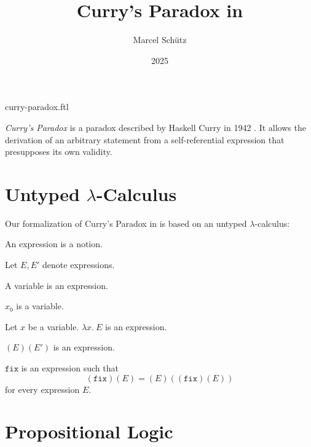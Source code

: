 \documentclass{stex}
\title{Curry's Paradox in \Naproche}
\author{Marcel Schütz}
\date{2025}
\newcommand{\varzero}{x_0}
\newcommand{\abs}[2]{\lambda#1.\ #2}
\newcommand{\app}[2]{(#1)(#2)}
\newcommand{\fix}{\texttt{fix}}
\begin{document}
\begin{smodule}{curry-paradox.ftl}
\maketitle

\noindent \emph{Curry's Paradox} is a paradox described by Haskell Curry in 
1942 \cite{Curry1942}.
It allows the derivation of an arbitrary statement from a self-referential 
expression that presupposes its own validity.

\section*{Untyped $\lambda$-Calculus}

\noindent Our formalization of Curry's Paradox in \Naproche is based on an 
untyped $\lambda$-calculus:

\begin{forthel}

  \begin{signature*}
    An expression is a notion.
  \end{signature*}

  Let $E, E'$ denote expressions.

  \begin{signature*}
    A variable is an expression.
  \end{signature*}

  \begin{signature*}
    $\varzero$ is a variable.
  \end{signature*}

  \begin{signature*}[title=Abstraction,id=abstraction]
    Let $x$ be a variable.
    $\abs{x}{E}$ is an expression.
  \end{signature*}

  \begin{signature*}[title=Application,id=application]
    $\app{E}{E'}$ is an expression.
  \end{signature*}

  \begin{signature*}[title=Fixed-point combinator,id=fixed_point_combinator]
    $\fix$ is an expression such that
    \[\app{\fix}{E} = \app{E}{\app{\fix}{E}}\]
    for every expression $E$.
  \end{signature*}
\end{forthel}


\section*{Propositional Logic}


\end{smodule}
\end{document}
